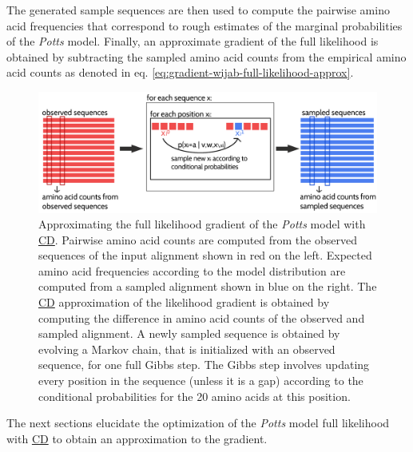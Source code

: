 \documentclass[11pt,a4paper,twoside]{book}
\theoremstyle{definition}
\theoremstyle{definition}
\theoremstyle{remark}
\begin{document}
The generated sample sequences are then used to compute the pairwise
amino acid frequencies that correspond to rough estimates of the
marginal probabilities of the \emph{Potts} model. Finally, an
approximate gradient of the full likelihood is obtained by subtracting
the sampled amino acid counts from the empirical amino acid counts as
denoted in eq. \eqref{eq:gradient-wijab-full-likelihood-approx}.















\begin{figure}

{\centering \includegraphics[width=0.9\linewidth]{img/full_likelihood/gibbs_sampling} 

}

\caption{Approximating the full likelihood gradient
of the \emph{Potts} model with \protect\hyperlink{abbrev}{CD}. Pairwise
amino acid counts are computed from the observed sequences of the input
alignment shown in red on the left. Expected amino acid frequencies
according to the model distribution are computed from a sampled
alignment shown in blue on the right. The \protect\hyperlink{abbrev}{CD}
approximation of the likelihood gradient is obtained by computing the
difference in amino acid counts of the observed and sampled alignment. A
newly sampled sequence is obtained by evolving a Markov chain, that is
initialized with an observed sequence, for one full Gibbs step. The
Gibbs step involves updating every position in the sequence (unless it
is a gap) according to the conditional probabilities for the 20 amino
acids at this position.}\label{fig:cd-gibbs-sampling}
\end{figure}

The next sections elucidate the optimization of the \emph{Potts} model
full likelihood with \protect\hyperlink{abbrev}{CD} to obtain an
approximation to the gradient.
\end{document}
